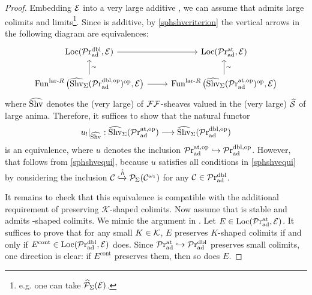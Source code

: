 \documentclass[a4paper,10pt, oneside]{amsart}
\begin{document}
	\begin{proof}
		Embedding $\mathcal{E}$ into a very large additive \infcat, we can assume that \mce admits large colimits and limits\footnote{e.g. one can take $\widehat{\mathcal{P}}_\Sigma(\mathcal{E})$.}. Since \mce is additive, by \cref{sphshvcriterion} the vertical arrows in the following diagram are equivalences: 
		$$\begin{tikzcd}
			{\op{Loc}(\praddbl,\mce)} \arrow[r]                                                                                     & {\op{Loc}(\prad^{\op{at}},\mce)}                                                                                      \\
			{\funct^{\op{lar}\text{-}R}\big(\widehat{\shv}_\Sigma(\praddblop)^\opp,\mce\big)} \arrow[u, "\sim"'] \arrow[r] & {\funct^{\op{lar}\text{-}R}\big(\widehat{\shv}_\Sigma(\prad^{\op{at,op}})^\opp,\mce\big)} \arrow[u, "\sim"']
		\end{tikzcd}
		$$
		where $\widehat{\operatorname{Shv}}$ denotes the (very large) \infcat of $\mathcal{F}\mathcal{F}$-sheaves valued in the (very large) \infcat $\widehat{\mathcal{S}}$ of large anima.
		Therefore, it suffices to show that the natural functor
		$$u_!|_{\widehat{\operatorname{Shv}}} :\widehat{\operatorname{Shv}}_\Sigma(\mathcal{P}\mathrm{r}_{\mathrm{ad}}^{\mathrm{at,op}}) \longrightarrow \widehat{\operatorname{Shv}}_\Sigma(\mathcal{P}\mathrm{r}_{\mathrm{ad}}^{\mathrm{dbl,op}})$$
		is an equivalence, where $u$ denotes the inclusion $\mathcal{P}\mathrm{r}_{\mathrm{ad}}^{\mathrm{at,op}}\hookrightarrow\mathcal{P}\mathrm{r}_{\mathrm{ad}}^{\mathrm{dbl,op}}$. However, that follows from 
		 \cref{sphshvequi}, because $u$ satisfies all conditions in \cref{sphshvequi} by considering the inclusion $\mathcal{C}\xhookrightarrow{\hat{h}}\mathcal{P}_{\Sigma}(\mathcal{C}^{\omega_1})$ for any $\mathcal{C}\in\mathcal{P}\mathrm{r}_{\mathrm{ad}}^{\mathrm{dbl}}$.
		 
		It remains to check that this equivalence is compatible with the additional requirement of preserving \(\mathcal K\)-shaped colimits. Now assume that \mce is stable and admits \mck-shaped colimits. We mimic the argument in \cite[Corollary 2.76]{ramzi2024dualizable}. Let $E\in \mathrm{Loc}(\mathcal{P}\mathrm{r}_{\mathrm{ad}}^{\mathrm{at}},\mathcal{E})$. It suffices to prove that for any small \infcat $K\in\mathcal{K}$, $E$ preserves $K$-shaped colimits if and only if $E^{\text{cont}}\in \mathrm{Loc}(\mathcal{P}\mathrm{r}_{\mathrm{ad}}^{\mathrm{dbl}},\mathcal{E})$ does. Since $\mathcal{P}\mathrm{r}_{\mathrm{ad}}^{\mathrm{at}}\hookrightarrow\mathcal{P}\mathrm{r}_{\mathrm{ad}}^{\mathrm{dbl}}$ preserves small colimits, one direction is clear: if $E^{\text{cont}}$ preserves them, then so does $E$.
		 

\end{proof}
\end{document}
